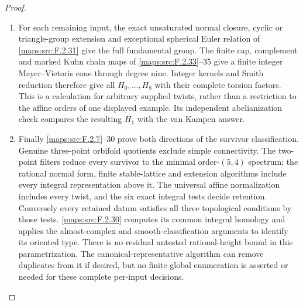 \begin{proof}
\begin{enumerate}[label=\arabic*.]
\item For each remaining input, the exact unsaturated normal
closure, cyclic or triangle-group extension and exceptional
spherical Euler relation of \ref{maps:src:F.2.31} give the full fundamental
group.  The finite cap, complement and marked Kuhn chain
maps of \ref{maps:src:F.2.33}--35 give a finite integer Mayer--Vietoris cone
through degree nine.  Integer kernels and Smith reduction
therefore give all $H_0,\ldots,H_8$ with their complete
torsion factors.  This is a calculation for arbitrary
supplied twists, rather than a restriction to the affine
orders of one displayed example.  Its independent
abelianization check compares the resulting $H_1$ with the
van Kampen answer.

\item Finally \ref{maps:src:F.2.7}--30 prove both directions of the survivor
classification.  Genuine three-point orbifold quotients
exclude simple connectivity.  The two-point filters reduce
every survivor to the minimal order-$(5,4)$ spectrum; the
rational normal form, finite stable-lattice and extension
algorithms include every integral representation above it.
The universal affine normalization includes every twist,
and the six exact integral tests decide retention.
Conversely every retained datum satisfies all three
topological conditions by those tests.  \ref{maps:src:F.2.30} computes
its common integral homology and applies the almost-complex
and smooth-classification arguments to identify its oriented
type.  There is no residual untested rational-height bound
in this parametrization.  The canonical-representative
algorithm can remove duplicates from it if desired, but
no finite global enumeration is asserted or needed for
these complete per-input decisions.

\end{enumerate}
\end{proof}





